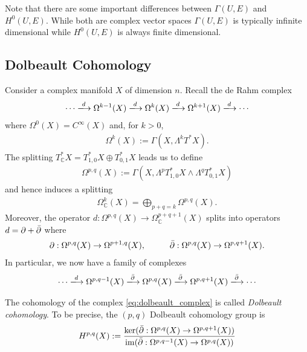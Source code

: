 \documentclass[12pt]{ociamthesis}  %
\begin{document}
Note that there are some important differences between $\Gamma(U,E)$
and $H^0(U,E)$. While both are complex vector spaces $\Gamma(U,E)$ is
typically infinite dimensional while $H^0(U,E)$ is always finite
dimensional.~\cite[Theorem 1.4.1]{ma2007}

\subsection{Dolbeault Cohomology}
\missingcitation

Consider a complex manifold $X$ of dimension $n$. Recall the de Rahm
complex
\begin{align*}
  \cdots \xlongrightarrow{d}
  \Omega^{k-1}(X)\xlongrightarrow{d}
  \Omega^{k}(X)\xlongrightarrow{d}
  \Omega^{k+1}(X)\xlongrightarrow{d}
  \cdots
\end{align*}
where $\Omega^0(X) = C^\infty(X)$ and, for $k > 0$,
\begin{align*}
  \Omega^k(X) := \Gamma(X,\Lambda^k T^*X).
\end{align*}
The splitting $T^*_\mathbb{C} X = T^*_{1,0}X \oplus T^*_{0,1}X$
leads us to define
\begin{align*}
  \Omega^{p,q}(X)
  := \Gamma(X,\Lambda^p T^*_{1,0}X \wedge\Lambda^q T^*_{0,1}X)
\end{align*}
and hence induces a splitting
\begin{align*}
  \Omega^k_{\mathbb{C}}(X) = \bigoplus_{p+q=k} \Omega^{p,q}(X).
\end{align*}
Moreover, the operator $d : \Omega^{p,q}(X) \to \Omega^{p+q+1}_{\mathbb{C}}(X)$ splits into operators $d = \partial + \bar{\partial}$ where
\begin{align*}
  \partial : \Omega^{p,q}(X) \to \Omega^{p+1,q}(X),\hspace{1cm}
  \bar{\partial} : \Omega^{p,q}(X) \to \Omega^{p,q+1}(X).
\end{align*}
In particular, we now have a family of complexes
\begin{align}\label{eq:dolbeault_complex}
  \cdots \xlongrightarrow{d}
  \Omega^{p,q-1}(X)\xlongrightarrow{\dol}
  \Omega^{p,q}(X)\xlongrightarrow{\dol}
  \Omega^{p,q+1}(X)\xlongrightarrow{\dol}
  \cdots
\end{align}
\begin{definition}
  The cohomology of the complex \ref{eq:dolbeault_complex} is
  called \emph{Dolbeault cohomology}. To be precise, the
  $(p,q)$ Dolbeault cohomology group is
  \begin{align*}
    H^{p,q}(X) := \frac{
      \ker(\bar{\partial} : \Omega^{p,q}(X) \to \Omega^{p,q+1}(X))
    }{
      \operatorname{im}(\bar{\partial} : \Omega^{p,q-1}(X) \to \Omega^{p,q}(X))
    }
  \end{align*}
\end{definition}
\end{document}
